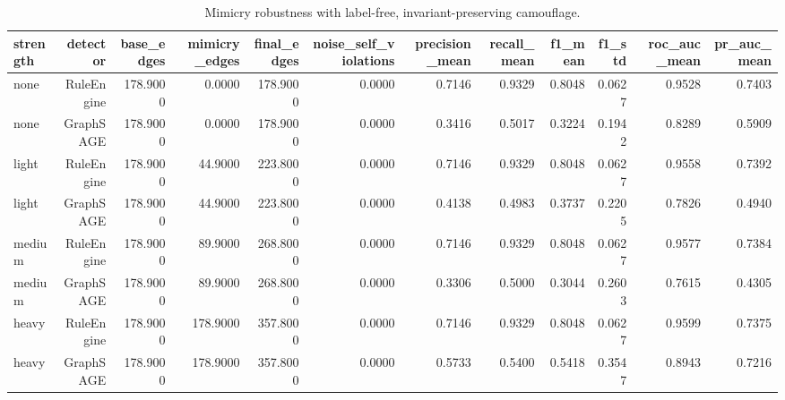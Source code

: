 \begin{table}[htbp]
\centering
\caption{Mimicry robustness with label-free, invariant-preserving camouflage.}
\label{tab:mimicry}
\begin{tabular}{lrrrrrrrrrrr}
\hline
strength & detector & base_edges & mimicry_edges & final_edges & noise_self_violations & precision_mean & recall_mean & f1_mean & f1_std & roc_auc_mean & pr_auc_mean \\
\hline
none & RuleEngine & 178.9000 & 0.0000 & 178.9000 & 0.0000 & 0.7146 & 0.9329 & 0.8048 & 0.0627 & 0.9528 & 0.7403 \\
none & GraphSAGE & 178.9000 & 0.0000 & 178.9000 & 0.0000 & 0.3416 & 0.5017 & 0.3224 & 0.1942 & 0.8289 & 0.5909 \\
light & RuleEngine & 178.9000 & 44.9000 & 223.8000 & 0.0000 & 0.7146 & 0.9329 & 0.8048 & 0.0627 & 0.9558 & 0.7392 \\
light & GraphSAGE & 178.9000 & 44.9000 & 223.8000 & 0.0000 & 0.4138 & 0.4983 & 0.3737 & 0.2205 & 0.7826 & 0.4940 \\
medium & RuleEngine & 178.9000 & 89.9000 & 268.8000 & 0.0000 & 0.7146 & 0.9329 & 0.8048 & 0.0627 & 0.9577 & 0.7384 \\
medium & GraphSAGE & 178.9000 & 89.9000 & 268.8000 & 0.0000 & 0.3306 & 0.5000 & 0.3044 & 0.2603 & 0.7615 & 0.4305 \\
heavy & RuleEngine & 178.9000 & 178.9000 & 357.8000 & 0.0000 & 0.7146 & 0.9329 & 0.8048 & 0.0627 & 0.9599 & 0.7375 \\
heavy & GraphSAGE & 178.9000 & 178.9000 & 357.8000 & 0.0000 & 0.5733 & 0.5400 & 0.5418 & 0.3547 & 0.8943 & 0.7216 \\
\hline
\end{tabular}
\end{table}
